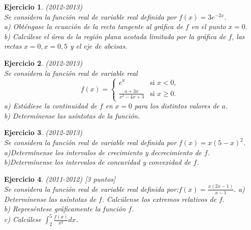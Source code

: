 \documentclass[12pt, a4paper]{amsart}
\newtheorem{ejer}{Ejercicio}
\begin{document}
\begin{ejer}\em (2012-2013)\\
Se considera la función real de variable real definida por $f(x)=3e^{-2x}$.\\
a) Obténgase la ecuación de la recta tangente al gráfica de $f$ en el punto $x=0$.\\
b) Calcúlese el área de la región plana acotada limitada por la gráfica de $f$, las rectas $x=0,x=0,5$ y el eje de abcisas.
\end{ejer}

\begin{ejer}\em (2012-2013)\\
Se considera la función real de variable real
\begin{equation*}
f(x)=\left \{ \begin{matrix} e^x & \mbox{si } x<0,
\\ \frac{a+3x}{x^2-4x+3} & \mbox{si } x \geq 0. \end{matrix}\right. 
\end{equation*}
a) Estúdiese la continuidad de $f$ en $x=0$ para los distintos valores de $a$.\\
b) Determínense las asíntotas de la función.
\end{ejer}

\begin{ejer}\em (2012-2013)\\
Se considera la función real de variable real definida por $f(x)=x(5-x)^2$.\\
a)Determínense los intervalos de crecimiento y decrecimiento de $f$.\\
b)Determínense los intervalos de concavidad y convexidad de $f$.
\end{ejer}

\begin{ejer}\em (2011-2012) [3 puntos]\\
Se considera la función real de variable real definida por:$f(x)=\frac{x(2x-1)}{x-1}.$
a) Determínense las asíntotas de $f$. Calcúlense los extremos relativos de $f$.\\
b) Represéntese gráficamente la función $f$.\\
c) Calcúlese $\int_2^5\frac{f(x)}{x^2}dx$.
\end{ejer}
\end{document}

